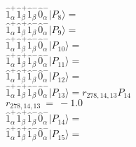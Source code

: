 \documentclass[14pt]{article}
\begin{document}
    $ \hat{1}_{\alpha}^{+}\hat{1}_{\beta}^{+}\hat{1}_{\beta}^{-}\hat{0}_{\alpha}^{-} \vert{P_{8}}\rangle =  $ \\ 
    $ \hat{1}_{\alpha}^{+}\hat{1}_{\beta}^{+}\hat{1}_{\beta}^{-}\hat{0}_{\alpha}^{-} \vert{P_{9}}\rangle =  $ \\ 
    $ \hat{1}_{\alpha}^{+}\hat{1}_{\beta}^{+}\hat{1}_{\beta}^{-}\hat{0}_{\alpha}^{-} \vert{P_{10}}\rangle =  $ \\ 
    $ \hat{1}_{\alpha}^{+}\hat{1}_{\beta}^{+}\hat{1}_{\beta}^{-}\hat{0}_{\alpha}^{-} \vert{P_{11}}\rangle =  $ \\ 
    $ \hat{1}_{\alpha}^{+}\hat{1}_{\beta}^{+}\hat{1}_{\beta}^{-}\hat{0}_{\alpha}^{-} \vert{P_{12}}\rangle =  $ \\ 
    $ \hat{1}_{\alpha}^{+}\hat{1}_{\beta}^{+}\hat{1}_{\beta}^{-}\hat{0}_{\alpha}^{-} \vert{P_{13}}\rangle = {r}_{278,14,13}P_{14} $ \\ 
    ${r}_{278,14,13}\ =\ -1.0 $ \\ 
    $ \hat{1}_{\alpha}^{+}\hat{1}_{\beta}^{+}\hat{1}_{\beta}^{-}\hat{0}_{\alpha}^{-} \vert{P_{14}}\rangle =  $ \\ 
    $ \hat{1}_{\alpha}^{+}\hat{1}_{\beta}^{+}\hat{1}_{\beta}^{-}\hat{0}_{\alpha}^{-} \vert{P_{15}}\rangle =  $ \\ 
    
\end{document}
